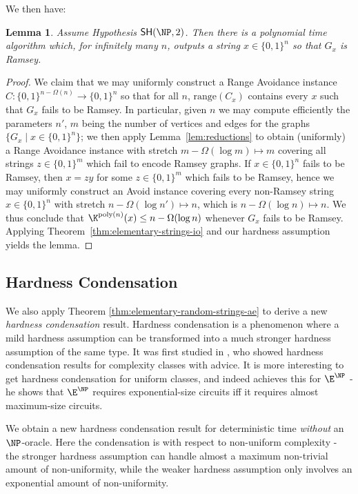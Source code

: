 \documentclass[11pt]{article}
\newtheorem{lemma}{Lemma}
\newcommand{\B}{\{0,1\}}
\newcommand{\SH}{\mathsf{SH}}
\renewcommand{\poly}{\mathrm{poly}}
\begin{document}
We then have:
\begin{lemma}
Assume Hypothesis $\SH(\NP,2)$. Then there is a polynomial time algorithm which, for infinitely many $n$, outputs a string $x \in \B^n$ so that $G_x$ is Ramsey.
\end{lemma}
\begin{proof}
We claim that we may uniformly construct a Range Avoidance instance $C: \B^{n - \Omega(n)} \to \B^n$ so that for all $n$, $\mathrm{range}(C_x)$ contains every $x$ such that $G_x$ fails to be Ramsey. In particular, given $n$ we may compute efficiently the parameters $n'$, $m$ being the number of vertices and edges for the graphs $\{G_x \mid x \in \B^n\}$; we then apply Lemma~\ref{lem:reductions} to obtain (uniformly) a Range Avoidance instance with stretch $m- \Omega(\log m) \mapsto m$ covering all strings $z \in \B^m$ which fail to encode Ramsey graphs. If $x \in \B^n$ fails to be Ramsey, then $x = z y$ for some $z \in \B^m$ which fails to be Ramsey, hence we may uniformly construct an Avoid instance covering every non-Ramsey string $x \in \B^n$ with stretch $n - \Omega(\log n') \mapsto n$, which is $n - \Omega(\log n) \mapsto n$.
We thus conclude that $\K^{\poly(n)}(x) \leq n - \Omega(\log n)$ whenever $G_x$ fails to be Ramsey. Applying Theorem~\ref{thm:elementary-strings-io} and our hardness assumption yields the lemma.
\end{proof}

\subsection{Hardness Condensation}\label{subsec:condense}

We also apply Theorem \ref{thm:elementary-random-strings-ae} to derive a new {\it hardness condensation} result. Hardness condensation is a phenomenon where a mild hardness assumption can be transformed into a much stronger hardness assumption of the same type. It was first studied in \cite{BOS06}, who showed hardness condensation results for complexity classes with advice. It is more interesting to get hardness condensation for uniform classes, and indeed \cite{Korten21} achieves this for $\E^{\NP}$ - he shows that $\E^{\NP}$ requires exponential-size circuits iff it requires almost maximum-size circuits. 

We obtain a new hardness condensation result for deterministic time {\it without} an $\NP$-oracle. Here the condensation is with respect to non-uniform complexity - the stronger hardness assumption can handle almost a maximum non-trivial amount of non-uniformity, while the weaker hardness assumption only involves an exponential amount of non-uniformity.
\end{document}
